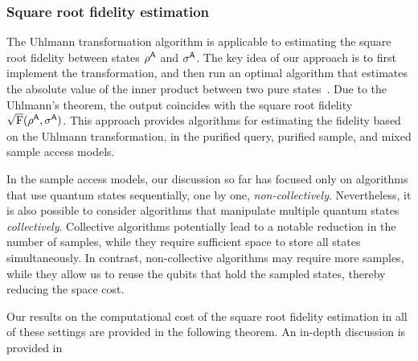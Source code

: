 



\subsubsection{Square root fidelity estimation}
\label{sec:overview of fidelity est}


The Uhlmann transformation algorithm is applicable to estimating the square root fidelity between states $\rho^{\mathsf{A}}$ and $\sigma^{\mathsf{A}}$.
The key idea of our approach is to first implement the transformation, and then run an optimal algorithm that estimates the absolute value of the inner product between two pure states~\cite{Wang2024OptimalFidelityPure, wang2024sampleoptimal}.
Due to the Uhlmann's theorem, the output coincides with the square root fidelity $\sqrt{{\mathrm{F}}}(\rho^{\mathsf{A}}, \sigma^{\mathsf{A}})$.
This approach provides algorithms for estimating the fidelity based on the Uhlmann transformation, in the purified query, purified sample, and mixed sample access models.



In the sample access models, our discussion so far has focused only on algorithms that use quantum states sequentially, one by one, \emph{non-collectively}.
Nevertheless, it is also possible to consider algorithms that manipulate multiple quantum states \emph{collectively}.
Collective algorithms potentially lead to a notable reduction in the number of samples, while they require sufficient space to store all states simultaneously. In contrast, non-collective algorithms may require more samples, while they allow us to reuse the qubits that hold the sampled states, thereby reducing the space cost.


Our results on the computational cost of the square root fidelity estimation in all of these settings are provided in the following theorem. 
An in-depth discussion is provided in~










